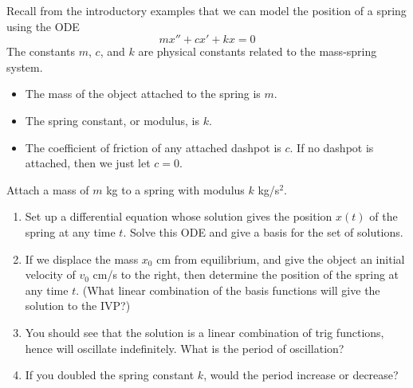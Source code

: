  Recall from the introductory examples that we can model the position of a spring using the ODE $$mx''+cx'+kx=0$$
 The constants $m$, $c$, and $k$ are physical constants related to the mass-spring system.
\begin{itemize}
 \item The mass of the object attached to the spring is $m$.
 \item The spring constant, or modulus, is $k$.
 \item The coefficient of friction of any attached dashpot is $c$. If no dashpot is attached, then we just let $c=0$.
\end{itemize}

% 

\begin{problem}
 Attach a mass of $m$ kg to a spring with modulus $k$ kg/s$^2$. 
\begin{enumerate}
 \item Set up a differential equation whose solution gives the position $x(t)$ of the spring at any time $t$. Solve this ODE and give a basis for the set of solutions. 
 \item If we displace the mass $x_0$ cm from equilibrium, and give the object an initial velocity of $v_0$ cm/s to the right, then determine the position of the spring at any time $t$. (What linear combination of the basis functions will give the solution to the IVP?)
 \item You should see that the solution is a linear combination of trig functions, hence will oscillate indefinitely. What is the period of oscillation? 
 \item If you doubled the spring constant $k$, would the period increase or decrease?

\end{enumerate}
\end{problem}



